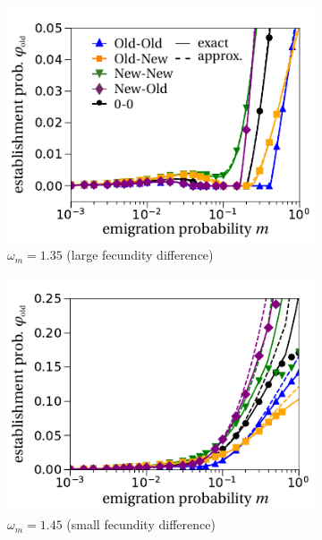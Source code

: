 \documentclass[a4paper,11pt]{scrartcl}
\begin{document}
\begin{figure}[t!]
	\centering
	\begin{subfigure}{.5\textwidth}
  		\centering
  		\includegraphics[width=\linewidth]{fig2a.pdf}
  		\caption{$\omega_m=1.35$ (large fecundity difference)}
	\end{subfigure}%
	\begin{subfigure}{.5\textwidth}
 		 \centering
 		 \includegraphics[width=\linewidth]{fig2c.pdf}
  	\caption{$\omega_m=1.45$ (small fecundity difference)}
	\end{subfigure}
	\begin{subfigure}{.5\textwidth}
  		\centering

\end{subfigure}
\end{figure}
\end{document}
